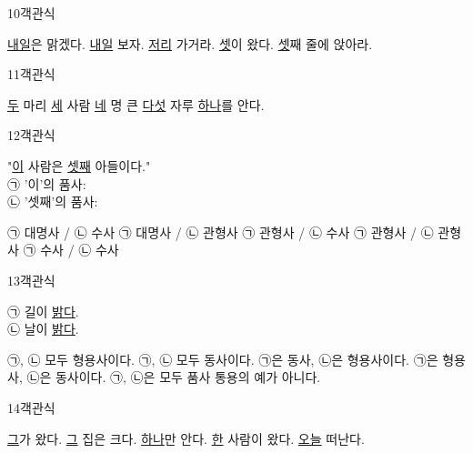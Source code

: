 \documentclass[fs9,seriesRus]{korfarm-base}
\begin{document}
\begin{kfQBlock}{10}{객관식}
\begin{kfChoices}
\kfChoice \uline{내일}은 맑겠다.
\kfChoice \uline{내일} 보자.
\kfChoice \uline{저리} 가거라.
\kfChoice \uline{셋}이 왔다.
\kfChoice \uline{셋}째 줄에 앉아라.
\end{kfChoices}
\end{kfQBlock}
\begin{kfQBlock}{11}{객관식}
\begin{kfChoices}
\kfChoice \uline{두} 마리
\kfChoice \uline{세} 사람
\kfChoice \uline{네} 명
\kfChoice 큰 \uline{다섯} 자루
\kfChoice \uline{하나}를 안다.
\end{kfChoices}
\end{kfQBlock}
\begin{kfQBlock}{12}{객관식}
\begin{kfEvidence}"\uline{이} 사람은 \uline{셋째} 아들이다." \\\relax
㉠ '이'의 품사: \kfFillBlank[12mm]{} \\\relax
㉡ '셋째'의 품사: \kfFillBlank[12mm]{}\end{kfEvidence}
\begin{kfChoices}
\kfChoice ㉠ 대명사 / ㉡ 수사
\kfChoice ㉠ 대명사 / ㉡ 관형사
\kfChoice ㉠ 관형사 / ㉡ 수사
\kfChoice ㉠ 관형사 / ㉡ 관형사
\kfChoice ㉠ 수사 / ㉡ 수사
\end{kfChoices}
\end{kfQBlock}
\begin{kfQBlock}{13}{객관식}
\begin{kfEvidence}㉠ 길이 \uline{밝다}. \\\relax
㉡ 날이 \uline{밝다}.\end{kfEvidence}
\begin{kfChoices}
\kfChoice ㉠, ㉡ 모두 형용사이다.
\kfChoice ㉠, ㉡ 모두 동사이다.
\kfChoice ㉠은 동사, ㉡은 형용사이다.
\kfChoice ㉠은 형용사, ㉡은 동사이다.
\kfChoice ㉠, ㉡은 모두 품사 통용의 예가 아니다.
\end{kfChoices}
\end{kfQBlock}
\begin{kfQBlock}{14}{객관식}
\begin{kfChoices}
\kfChoice \uline{그}가 왔다.
\kfChoice \uline{그} 집은 크다.
\kfChoice \uline{하나}만 안다.
\kfChoice \uline{한} 사람이 왔다.
\kfChoice \uline{오늘} 떠난다.
\end{kfChoices}
\end{kfQBlock}
\end{document}

